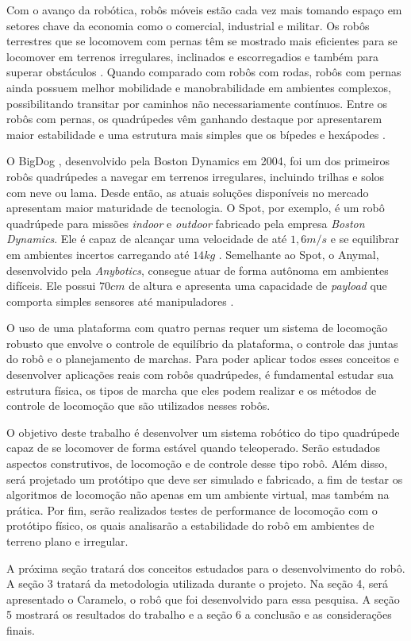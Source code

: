 \documentclass[../main.tex]{subfiles}
\begin{document}
Com o avanço da robótica, robôs móveis estão cada vez mais tomando espaço em setores chave da economia como o comercial, industrial e militar. Os robôs terrestres que se locomovem com pernas têm se mostrado mais eficientes para se locomover em terrenos irregulares, inclinados e escorregadios e também para superar obstáculos \cite{X.134}. Quando comparado com robôs com rodas, robôs com pernas ainda possuem melhor mobilidade e manobrabilidade em ambientes complexos, possibilitando transitar por caminhos não necessariamente contínuos. Entre os robôs com pernas, os quadrúpedes vêm ganhando destaque por apresentarem maior estabilidade e uma estrutura mais simples que os bípedes e hexápodes \cite{Shi2021}.

O BigDog \cite{RAIBERT200810822}, desenvolvido pela Boston Dynamics em 2004, foi um dos primeiros robôs quadrúpedes a navegar em terrenos irregulares, incluindo trilhas e solos com neve ou lama. Desde então, as atuais soluções disponíveis no mercado apresentam maior maturidade de tecnologia. O Spot, por exemplo, é um robô quadrúpede para missões \textit{indoor} e \textit{outdoor} fabricado pela empresa \textit{Boston Dynamics}. Ele é capaz de alcançar uma velocidade de até $1,6 m/s$ e se equilibrar em ambientes incertos carregando até $14 kg$ \cite{Spot}.  Semelhante ao Spot, o Anymal, desenvolvido pela \textit{Anybotics}, consegue atuar de forma autônoma em ambientes difíceis. Ele possui $70 cm$ de altura e apresenta uma capacidade de \textit{payload} que comporta simples sensores até manipuladores \cite{Fankhauser2018}.

O uso de uma plataforma com quatro pernas requer um sistema de locomoção robusto que envolve o controle de equilíbrio da plataforma, o controle das juntas do robô e o planejamento de marchas. Para poder aplicar todos esses conceitos e desenvolver aplicações reais com robôs quadrúpedes, é fundamental estudar sua estrutura física, os tipos de marcha que eles podem realizar e os métodos de controle de locomoção que são utilizados nesses robôs.

O objetivo deste trabalho é desenvolver um sistema robótico do tipo quadrúpede capaz de se locomover de forma estável quando teleoperado. Serão estudados aspectos construtivos, de locomoção e de controle desse tipo robô. Além disso, será projetado um protótipo que deve ser simulado e fabricado, a fim de testar os algoritmos de locomoção não apenas em um ambiente virtual, mas também na prática. Por fim, serão realizados testes de performance de locomoção com o protótipo físico, os quais analisarão a estabilidade do robô em ambientes de terreno plano e irregular.

A próxima seção tratará dos conceitos estudados para o desenvolvimento do robô. A seção 3 tratará da metodologia utilizada durante o projeto. Na seção 4, será apresentado o Caramelo, o robô que foi desenvolvido para essa pesquisa. A seção 5 mostrará os resultados do trabalho e a seção 6 a conclusão e as considerações finais.  
\end{document}
